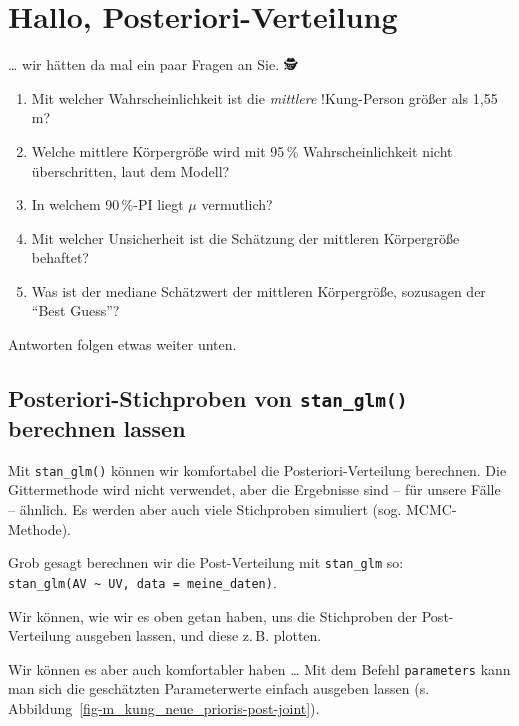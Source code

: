 \documentclass[
  ngerman,
  letterpaper,
  twoside,
  open=any]{scrbook}
\providecommand{\tightlist}{%
  \setlength{\itemsep}{0pt}\setlength{\parskip}{0pt}}\usepackage{longtable,booktabs,array}
\theoremstyle{definition}
\theoremstyle{plain}
\theoremstyle{definition}
\theoremstyle{definition}
\theoremstyle{definition}
\theoremstyle{definition}
\theoremstyle{remark}
\begin{document}
\section{Hallo,
Posteriori-Verteilung}\label{hallo-posteriori-verteilung}

\ldots{} wir hätten da mal ein paar Fragen an Sie. 🕵

\begin{enumerate}
\def\labelenumi{\arabic{enumi}.}
\tightlist
\item
  Mit welcher Wahrscheinlichkeit ist die \emph{mittlere} !Kung-Person
  größer als 1,55\,m?
\item
  Welche mittlere Körpergröße wird mit 95\,\% Wahrscheinlichkeit nicht
  überschritten, laut dem Modell?
\item
  In welchem 90\,\%-PI liegt \(\mu\) vermutlich?
\item
  Mit welcher Unsicherheit ist die Schätzung der mittleren Körpergröße
  behaftet?
\item
  Was ist der mediane Schätzwert der mittleren Körpergröße, sozusagen
  der \enquote{Best Guess}?
\end{enumerate}

Antworten folgen etwas weiter unten.

\subsection{\texorpdfstring{Posteriori-Stichproben von
\texttt{stan\_glm()} berechnen
lassen}{Posteriori-Stichproben von stan\_glm() berechnen lassen}}\label{posteriori-stichproben-von-stan_glm-berechnen-lassen}

Mit \texttt{stan\_glm()} können wir komfortabel die
Posteriori-Verteilung berechnen. Die Gittermethode wird nicht verwendet,
aber die Ergebnisse sind -- für unsere Fälle -- ähnlich. Es werden aber
auch viele Stichproben simuliert (sog. MCMC-Methode).

Grob gesagt berechnen wir die Post-Verteilung mit \texttt{stan\_glm} so:
\texttt{stan\_glm(AV\ \textasciitilde{}\ UV,\ data\ =\ meine\_daten)}.

Wir können, wie wir es oben getan haben, uns die Stichproben der
Post-Verteilung ausgeben lassen, und diese z.\,B. plotten.

Wir können es aber auch komfortabler haben \ldots{} Mit dem Befehl
\texttt{parameters} kann man sich die geschätzten Parameterwerte einfach
ausgeben lassen (s. Abbildung~\ref{fig-m_kung_neue_prioris-post-joint}).
\end{document}
